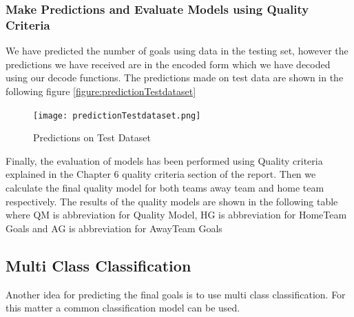 \subsubsection{Make Predictions and Evaluate Models using Quality Criteria } %
We have predicted the number of goals using data in the testing set, however the predictions we have received are in the encoded form which we have decoded using our decode functions. The predictions made on test data are shown in the following figure \autoref{figure:predictionTestdataset} \newline
\begin{figure}[H]
\begin{center}
\texttt{[image: predictionTestdataset.png]}
\end{center}
\caption{Predictions on Test Dataset }
\label{figure:predictionTestdataset}
\end{figure}
Finally, the evaluation of models has been performed using Quality criteria explained in the Chapter 6 quality criteria section of the report. Then we calculate the final quality model for both teams away team and home team respectively. The results of the quality models are shown in the following table where QM is abbreviation for Quality Model, HG is abbreviation for HomeTeam Goals and AG is abbreviation for AwayTeam Goals\newline

\begin{table}
\centering
{}
\caption{ Quality Model for Away Team and Home Team}
\label{table:qualitymodelregression}
\end{table}



\subsection{Multi Class Classification}
Another idea for predicting the final goals is to use multi class classification. For this matter a common classification model can be used. 

